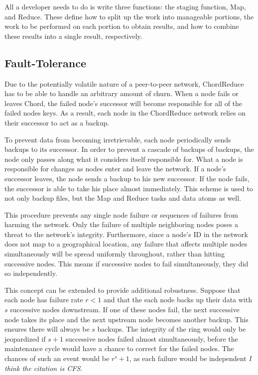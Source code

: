 All a developer needs to do is write three functions: the staging function, Map, and Reduce.  These define how to split up the work into manageable portions, the work to be performed on each portion to obtain results, and how to combine these results into a single result, respectively. 



\subsection{Fault-Tolerance}
Due to the potentially volatile nature of a peer-to-peer network, ChordReduce has to be able to handle an arbitrary amount of churn. When a node fails or leaves Chord, the failed node's successor will become responsible for all of the failed nodes keys. As a result, each node in the ChordReduce network relies on their successor to act as a backup.  

To prevent data from becoming irretrievable, each node periodically sends backups to its successor.  In order to prevent a cascade of backups of backups, the node only passes along what it considers itself responsible for.  What a node is responsible for changes as nodes enter and leave the network.  If a node's successor leaves, the node sends a backup to his new successor.  If the node fails, the successor is able to take his place almost immediately.  This scheme is used to not only backup files, but the Map and Reduce tasks and data atoms as well.

This procedure prevents any single node failure or sequences of failures from harming the network. Only the failure of multiple neighboring nodes poses a threat to the network's integrity.  Furthermore, since a node's ID in the network does not map to a geographical location, any failure that affects multiple nodes simultaneously will be spread uniformly throughout, rather than hitting successive nodes.  This means if successive nodes to fail simultaneously, they did so independently.

This concept can be extended to provide additional robustness.  Suppose that each node has failure rate $r < 1$ and that the each node backs up their data with $s$ successive nodes downstream. If one of these nodes fail, the next successive node takes its place and the next upstream node becomes another backup. This ensures there will always be $s$ backups. The integrity of the ring would only be jeopardized if $s+1$ successive nodes failed almost simultaneously, before the maintenance cycle would have a chance to correct for the failed nodes.  The chances of such an event would be $r^s+1$, as each failure would be independent \textit{I think the citation is CFS}.


